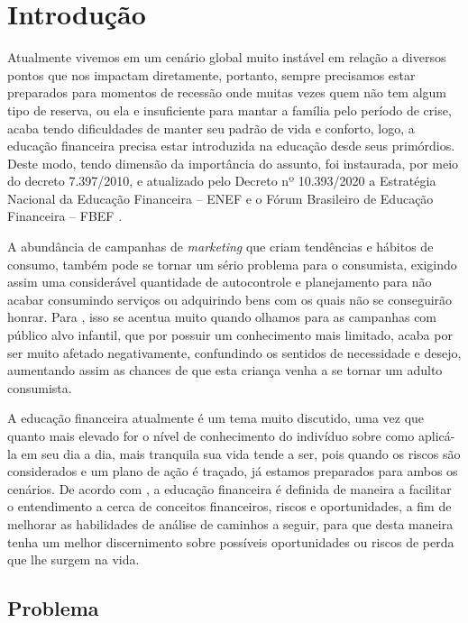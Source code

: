 \chapter{Introdução}

    Atualmente vivemos em um cenário global muito instável em relação a diversos pontos que nos impactam diretamente,
    portanto, sempre precisamos estar preparados para momentos de recessão onde muitas vezes quem não tem algum tipo de
    reserva, ou ela e insuficiente para mantar a família pelo período de crise, acaba tendo dificuldades de manter seu
    padrão de vida e conforto, logo, a educação financeira precisa estar introduzida na educação desde seus primórdios.
    Deste modo, tendo dimensão da importância do assunto, foi instaurada, por meio do decreto 7.397/2010, e atualizado
    pelo Decreto nº 10.393/2020 a Estratégia Nacional da Educação Financeira -- ENEF e o Fórum Brasileiro de Educação
    Financeira -- FBEF \cite{decreto_10939}.

    A abundância de campanhas de \textit{marketing} que criam tendências e hábitos de consumo, também pode se tornar um
    sério problema para o consumista, exigindo assim uma considerável quantidade de autocontrole e planejamento para não
    acabar consumindo serviços ou adquirindo bens com os quais não se conseguirão honrar.
    Para , isso se acentua muito quando olhamos para as campanhas
    com público alvo infantil, que por possuir um conhecimento mais limitado, acaba por ser muito afetado negativamente,
    confundindo os sentidos de necessidade e desejo, aumentando assim as chances de que esta criança venha a se tornar
    um adulto consumista.

    A educação financeira atualmente é um tema muito discutido, uma vez que quanto mais elevado for o nível de
    conhecimento do indivíduo sobre como aplicá-la em seu dia a dia, mais tranquila sua vida tende a ser, pois quando os
    riscos são considerados e um plano de ação é traçado, já estamos preparados para ambos os cenários. De acordo com
    , a educação financeira é definida de maneira a facilitar o entendimento a cerca de conceitos
    financeiros, riscos e oportunidades, a fim de melhorar as habilidades de análise de caminhos a seguir, para que
    desta maneira tenha um melhor discernimento sobre possíveis oportunidades ou riscos de perda que lhe surgem na vida.

    \section{Problema}

